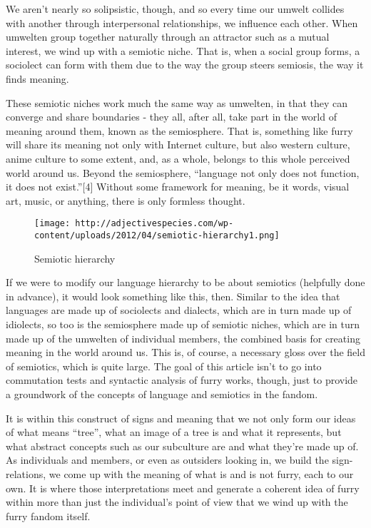 We aren't nearly so solipsistic, though, and so every time our umwelt
collides with another through interpersonal relationships, we influence
each other. When umwelten group together naturally through an attractor
such as a mutual interest, we wind up with a semiotic niche. That is,
when a social group forms, a sociolect can form with them due to the way
the group steers semiosis, the way it finds meaning.

These semiotic niches work much the same way as umwelten, in that they
can converge and share boundaries - they all, after all, take part in
the world of meaning around them, known as the semiosphere. That is,
something like furry will share its meaning not only with Internet
culture, but also western culture, anime culture to some extent, and, as
a whole, belongs to this whole perceived world around us. Beyond the
semiosphere, ``language not only does not function, it does not
exist.''{[}4{]} Without some framework for meaning, be it words, visual
art, music, or anything, there is only formless thought.

\begin{figure}[htbp]
\centering
\texttt{[image: http://adjectivespecies.com/wp-content/uploads/2012/04/semiotic-hierarchy1.png]}
\caption{Semiotic hierarchy}
\end{figure}

If we were to modify our language hierarchy to be about semiotics
(helpfully done in advance), it would look something like this, then.
Similar to the idea that languages are made up of sociolects and
dialects, which are in turn made up of idiolects, so too is the
semiosphere made up of semiotic niches, which are in turn made up of the
umwelten of individual members, the combined basis for creating meaning
in the world around us. This is, of course, a necessary gloss over the
field of semiotics, which is quite large. The goal of this article isn't
to go into commutation tests and syntactic analysis of furry works,
though, just to provide a groundwork of the concepts of language and
semiotics in the fandom.

It is within this construct of signs and meaning that we not only form
our ideas of what means ``tree'', what an image of a tree is and what it
represents, but what abstract concepts such as our subculture are and
what they're made up of. As individuals and members, or even as
outsiders looking in, we build the sign-relations, we come up with the
meaning of what is and is not furry, each to our own. It is where those
interpretations meet and generate a coherent idea of furry within more
than just the individual's point of view that we wind up with the furry
fandom itself.

